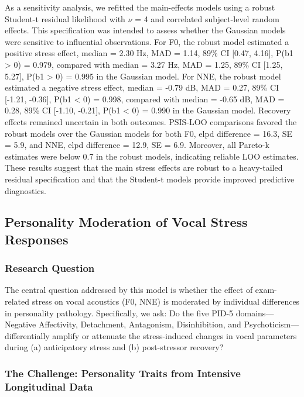 \documentclass[
  english,
  man,floatsintext]{apa6}
\begin{document}
As a sensitivity analysis, we refitted the main-effects models using a robust Student-t residual likelihood with \(\nu\) = 4 and correlated subject-level random effects. This specification was intended to assess whether the Gaussian models were sensitive to influential observations. For F0, the robust model estimated a positive stress effect, median = 2.30 Hz, MAD = 1.14, 89\% CI {[}0.47, 4.16{]}, P(b1 \textgreater{} 0) = 0.979, compared with median = 3.27 Hz, MAD = 1.25, 89\% CI {[}1.25, 5.27{]}, P(b1 \textgreater{} 0) = 0.995 in the Gaussian model. For NNE, the robust model estimated a negative stress effect, median = -0.79 dB, MAD = 0.27, 89\% CI {[}-1.21, -0.36{]}, P(b1 \textless{} 0) = 0.998, compared with median = -0.65 dB, MAD = 0.28, 89\% CI {[}-1.10, -0.21{]}, P(b1 \textless{} 0) = 0.990 in the Gaussian model. Recovery effects remained uncertain in both outcomes. PSIS-LOO comparisons favored the robust models over the Gaussian models for both F0, elpd difference = 16.3, SE = 5.9, and NNE, elpd difference = 12.9, SE = 6.9. Moreover, all Pareto-k estimates were below 0.7 in the robust models, indicating reliable LOO estimates. These results suggest that the main stress effects are robust to a heavy-tailed residual specification and that the Student-t models provide improved predictive diagnostics.

\subsection{Personality Moderation of Vocal Stress Responses}\label{personality-moderation-of-vocal-stress-responses}

\subsubsection{Research Question}\label{research-question-1}

The central question addressed by this model is whether the effect of exam-related stress on vocal acoustics (F0, NNE) is moderated by individual differences in personality pathology. Specifically, we ask: Do the five PID-5 domains---Negative Affectivity, Detachment, Antagonism, Disinhibition, and Psychoticism---differentially amplify or attenuate the stress-induced changes in vocal parameters during (a) anticipatory stress and (b) post-stressor recovery?

\subsubsection{The Challenge: Personality Traits from Intensive Longitudinal Data}\label{the-challenge-personality-traits-from-intensive-longitudinal-data}
\end{document}
